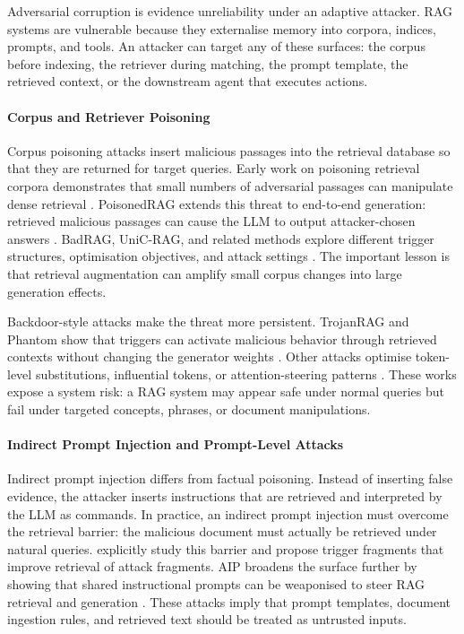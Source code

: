 
Adversarial corruption is evidence unreliability under an adaptive attacker. RAG systems are vulnerable because they externalise memory into corpora, indices, prompts, and tools. An attacker can target any of these surfaces: the corpus before indexing, the retriever during matching, the prompt template, the retrieved context, or the downstream agent that executes actions.





\paragraph{Corpus and Retriever Poisoning}

Corpus poisoning attacks insert malicious passages into the retrieval database so that they are returned for target queries. Early work on poisoning retrieval corpora demonstrates that small numbers of adversarial passages can manipulate dense retrieval \citep{poisoningRetrievalCorpora2023}. PoisonedRAG extends this threat to end-to-end generation: retrieved malicious passages can cause the LLM to output attacker-chosen answers \citep{poisonedRAG2024}. BadRAG, UniC-RAG, and related methods explore different trigger structures, optimisation objectives, and attack settings \citep{badRAG2024,rrag049,rrag057}. The important lesson is that retrieval augmentation can amplify small corpus changes into large generation effects.

Backdoor-style attacks make the threat more persistent. TrojanRAG and Phantom show that triggers can activate malicious behavior through retrieved contexts without changing the generator weights \citep{trojanRAG2024,phantom2024}. Other attacks optimise token-level substitutions, influential tokens, or attention-steering patterns \citep{rrag050,rrag052,rrag120}. These works expose a system risk: a RAG system may appear safe under normal queries but fail under targeted concepts, phrases, or document manipulations.

\paragraph{Indirect Prompt Injection and Prompt-Level Attacks}

Indirect prompt injection differs from factual poisoning. Instead of inserting false evidence, the attacker inserts instructions that are retrieved and interpreted by the LLM as commands. In practice, an indirect prompt injection must overcome the retrieval barrier: the malicious document must actually be retrieved under natural queries. \citet{rrag005} explicitly study this barrier and propose trigger fragments that improve retrieval of attack fragments. AIP broadens the surface further by showing that shared instructional prompts can be weaponised to steer RAG retrieval and generation \citep{aip2025}. These attacks imply that prompt templates, document ingestion rules, and retrieved text should be treated as untrusted inputs.


